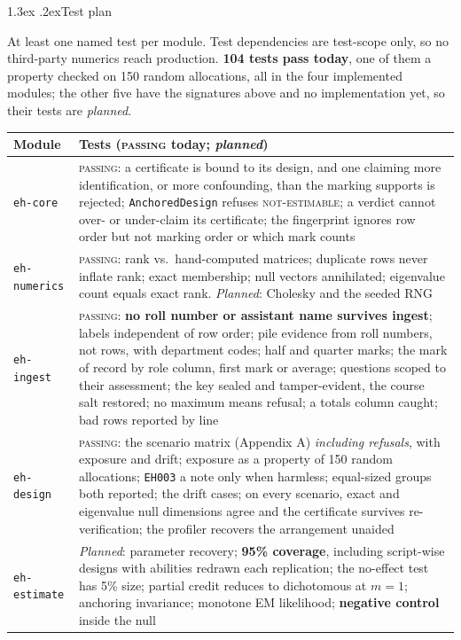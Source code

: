 \documentclass[10pt,a4paper]{article}
\makeatletter
\renewcommand\section{\@startsection{section}{1}{\z@}{-2.8ex \@plus -.6ex \@minus -.2ex}%
  {1.3ex \@plus .2ex}{\normalfont\Large\bfseries}}
\makeatother
\begin{document}
\section{Test plan}
\label{sec:tests}

At least one named test per module. Test dependencies are test-scope only, so no third-party
numerics reach production. \textbf{104 tests pass today}, one of them a property checked on 150
random allocations, all in the four implemented modules; the other five have the signatures above and
no implementation yet, so their tests are \emph{planned}.

\begin{table}[!htbp]\centering\small
\begin{tabular}{|l|p{13.7cm}|}
\hline
\textbf{Module} & \textbf{Tests} (\textsc{passing} today; \emph{planned}) \\
\hline
\texttt{eh-core} & \textsc{passing}: a certificate is bound to its design, and one claiming more identification, or more confounding, than the marking supports is rejected; \texttt{AnchoredDesign} refuses \textsc{not-estimable}; a verdict cannot over- or under-claim its certificate; the fingerprint ignores row order but not marking order or which mark counts \\
\texttt{eh-numerics} & \textsc{passing}: rank vs.\ hand-computed matrices; duplicate rows never inflate rank; exact membership; null vectors annihilated; eigenvalue count equals exact rank. \emph{Planned}: Cholesky and the seeded RNG \\
\texttt{eh-ingest} & \textsc{passing}: \textbf{no roll number or assistant name survives ingest}; labels independent of row order; pile evidence from roll numbers, not rows, with department codes; half and quarter marks; the mark of record by role column, first mark or average; questions scoped to their assessment; the key sealed and tamper-evident, the course salt restored; no maximum means refusal; a totals column caught; bad rows reported by line \\
\texttt{eh-design} & \textsc{passing}: the scenario matrix (Appendix A) \emph{including refusals}, with exposure and drift; exposure as a property of 150 random allocations; \texttt{EH003} a note only when harmless; equal-sized groups both reported; the drift cases; on every scenario, exact and eigenvalue null dimensions agree and the certificate survives re-verification; the profiler recovers the arrangement unaided \\
\texttt{eh-estimate} & \emph{Planned}: parameter recovery; \textbf{95\% coverage}, including script-wise designs with abilities redrawn each replication; the no-effect test has 5\% size; partial credit reduces to dichotomous at $m{=}1$; anchoring invariance; monotone EM likelihood; \textbf{negative control} inside the null \\

\end{tabular}
\end{table}
\end{document}
